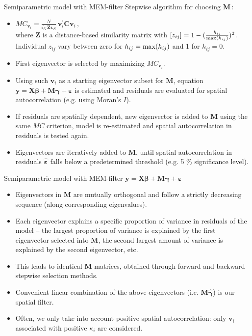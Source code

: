 \documentclass{beamer}
\begin{document}
\begin{frame}{Semiparametric model with MEM-filter}
Stepwise algorithm for choosing $\bm{M}\,$:
\medskip
\begin{itemize}
    \item $\textit{MC}_{\bm{v}_i} = \frac{N}{\bm{\iota}_N^{\prime} \, \bm{Z} \, \bm{\iota}_N } \, \bm{v}_i^{\prime} \bm{C} \bm{v}_i \, ,$\\ \smallskip
    where $\bm{Z}$ is a distance-based similarity matrix with $[z_{ij}] = 1 - (\tfrac{h_{ij}}{\textnormal{max}(h_{ij})})^2$. Individual $z_{ij}$ vary between zero for $h_{ij} = \textnormal{max}(h_{ij})$ and 1 for $h_{ij} = 0$.
    \smallskip
    \item First eigenvector is selected by maximizing $\textit{MC}_{\bm{v}_i}$. 
    \smallskip 
    \item Using such $\bm{v}_i$ as a starting eigenvector subset for $\bm{M}$, equation $\bm{y} = \bm{X \beta } + \bm{M \gamma} + \bm{\varepsilon}$ is estimated and residuals are evaluated for spatial autocorrelation (e.g. using Moran's $I$). 
    \smallskip
    \item If residuals are spatially dependent, new eigenvector is added to $\bm{M}$ using the same $\textit{MC}$ criterion, model is re-estimated and spatial autocorrelation in residuals is tested again. \smallskip 
    \item Eigenvectors are iteratively added to $\bm{M}$, until spatial autocorrelation in residuals $\bm{\hat{\varepsilon}}$ falls below a predetermined threshold (e.g. 5 \% significance level).
\end{itemize}
\end{frame}
\begin{frame}{Semiparametric model with MEM-filter}
$\bm{y} = \bm{X \beta } + \bm{M \gamma} + \bm{\varepsilon}$
\medskip
\begin{itemize}
    \item Eigenvectors in $\bm{M}$ are mutually orthogonal and follow a strictly decreasing sequence (along corresponding eigenvalues).
    \smallskip
    \item Each eigenvector explains a specific proportion of variance in residuals of the model -- the largest proportion of variance is explained by the first eigenvector selected into $\bm{M}$, the second largest amount of variance is explained by the second eigenvector, etc. 
    \smallskip
    \item This leads to identical $\bm{M}$ matrices, obtained through forward and backward stepwise selection methods. 
    \smallskip
    \item Convenient linear combination of the above eigenvectors (i.e. $\bm{M\hat{\gamma}}$) is our spatial filter. 
    \smallskip
    \item Often, we only take into account positive spatial autocorrelation: only $\bm{v}_i$ associated with positive $\kappa_i$ are considered.
\end{itemize}
\end{frame}
\end{document}
